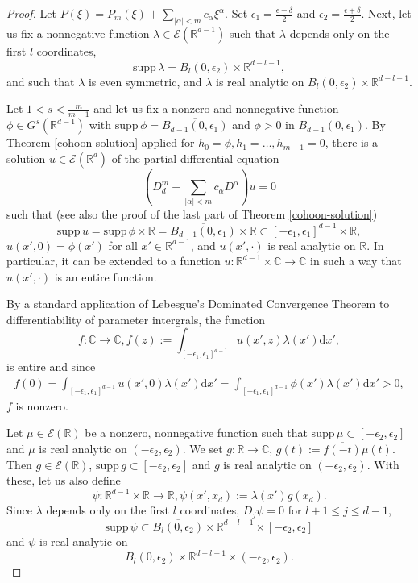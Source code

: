\documentclass[10pt,a4paper]{amsart}
\newcommand{\C}{\mathbb{C}}
\newcommand{\R}{\mathbb{R}}
\newcommand{\supp}{\mbox{supp}\,}
\begin{document}
\begin{proof}
Let $P(\xi)=P_m(\xi)+\sum_{|\alpha|<m}c_\alpha\xi^\alpha$. Set $\epsilon_1=\frac{\epsilon-\delta}{2}$ and $\epsilon_2=\frac{\epsilon+\delta}{2}$. Next, let us fix a nonnegative function $\lambda\in \mathscr{E}(\R^{d-1})$ such that $\lambda$ depends only on the first $l$ coordinates,
\[\supp\lambda=\overline{B_l(0,\epsilon_2)}\times\R^{d-l-1},\] and such that $\lambda$ is even symmetric, and $\lambda$ is real analytic on $B_l(0,\epsilon_2)\times\R^{d-l-1}$. 
	
	Let $1<s<\frac{m}{m-1}$ and let us fix a nonzero and nonnegative function $\phi\in G^s(\R^{d-1})$ with $\supp\phi=\overline{B_{d-1}(0,\epsilon_1)}$ and $\phi>0$ in $B_{d-1}(0,\epsilon_1)$.
	By Theorem \ref{cohoon-solution} applied for $h_0=\phi, h_1=\ldots,h_{m-1}=0$, there is a solution $u\in \mathscr{E}(\R^d)$ of the partial differential equation
	\[\left(D_d^m+\sum_{|\alpha|<m} c_\alpha D^\alpha\right)u=0\]
	such that (see also the proof of the last part of Theorem \ref{cohoon-solution})
	$$\supp{u}=\supp\phi\times\R=\overline{B_{d-1}(0,\epsilon_1)}\times\R\subset[-\epsilon_1,\epsilon_1]^{d-1}\times\R,$$
	$u(x',0)=\phi(x')$ for all $x'\in\R^{d-1}$, and $u(x',\cdot)$ is real analytic on $\R$. In particular, it can be extended to a function $u\colon\R^{d-1}\times\C\to\C$ in such a way that $u(x',\cdot)$ is an entire function.
	
	By a standard application of Lebesgue's Dominated Convergence Theorem to differentiability of parameter intergrals, the function
	\[f\colon\C\to\C, f(z):=\int_{\left[-\epsilon_1,\epsilon_1\right]^{d-1}}u(x',z)\lambda(x')\mathrm{d}x',\]
	is entire and since
	\begin{align*}
		f(0)=\int_{\left[-\epsilon_1,\epsilon_1\right]^{d-1}}u(x',0)\lambda(x')\mathrm{d}x'=\int_{\left[-\epsilon_1,\epsilon_1\right]^{d-1}}\phi(x')\lambda(x')\mathrm{d}x'>0,
	\end{align*}
	$f$ is nonzero. 
	
	Let $\mu\in \mathscr{E}(\R)$ be a nonzero, nonnegative function such that $\supp\mu\subset\left[-\epsilon_2,\epsilon_2\right]$ and $\mu$ is real analytic on $\left(-\epsilon_2,\epsilon_2\right)$. We set $g\colon\R\to\C$, $g(t):=\overline{f(-t)}\mu(t)$. Then $g\in \mathscr{E}(\R)$, $\supp g\subset\left[-\epsilon_2,\epsilon_2\right]$ and $g$ is real analytic on $\left(-\epsilon_2,\epsilon_2\right)$. With these, let us also define
	\[\psi\colon\R^{d-1}\times\R\to\R, \psi(x',x_d):=\lambda(x')g(x_d).\]
	Since $\lambda$ depends only on the first $l$ coordinates, $D_j\psi=0$ for $l+1\leq j\leq d-1$,
	\[\supp{\psi}\subset\overline{B_{l}(0,\epsilon_2)}\times\R^{d-l-1}\times\left[-\epsilon_2,\epsilon_2\right]\] and $\psi$ is real analytic on
    \[B_{l}(0,\epsilon_2)\times\R^{d-l-1}\times\left(-\epsilon_2,\epsilon_2\right).\]
	

\end{proof}
\end{document}
